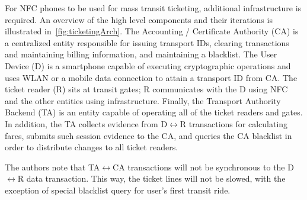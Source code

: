 \documentclass{sig-alternate}
\begin{document}
For NFC phones to be used for mass transit ticketing, additional infrastructure is required. An overview of the high level components and their iterations is illustrated in~\ref{fig:ticketingArch}. The Accounting / Certificate Authority (CA) is a centralized entity responsible for issuing transport IDs, clearing transactions and maintaining billing information, and maintaining a blacklist. The User Device (D) is a smartphone capable of executing cryptographic operations and uses WLAN or a mobile data connection to attain a transport ID from CA. The ticket reader (R) sits at transit gates; R communicates with the D using NFC and the other entities using infrastructure. Finally, the Transport Authority Backend (TA) is an entity capable of operating all of the ticket readers and gates. In addition, the TA collects evidence from D$\leftrightarrow$R transactions for calculating fares, submits such session evidence to the CA, and queries the CA blacklist in order to distribute changes to all ticket readers.

The authors note that TA$\leftrightarrow$CA transactions will not be synchronous to the D$\leftrightarrow$R data transaction. This way, the ticket lines will not be slowed, with the exception of special blacklist query for user's first transit ride.
\end{document}
